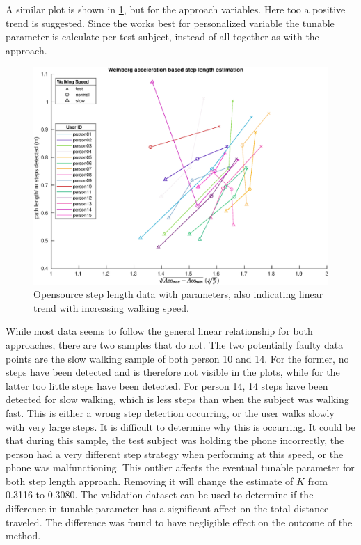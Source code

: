 A similar plot is shown in \cref{fig:step_length_weinberg}, but for the \citet{Weinberg2002} approach variables. Here too a positive trend is suggested. Since the \citet{Weinberg2002} works best for personalized variable the tunable parameter is calculate per test subject, instead of all together as with the \citet{Tian2016} approach. 

\begin{figure}[H]
	\centering
	\includegraphics[width=0.8\linewidth]{images/20201113_1639_weinberg}
	\caption{Opensource step length data with \citet{Weinberg2002} parameters, also indicating linear trend with increasing walking speed.}
	\label{fig:step_length_weinberg}
\end{figure}

While most data seems to follow the general linear relationship for both approaches, there are two samples that do not. The two potentially faulty data points are the slow walking sample of both person 10 and 14. For the former, no steps have been detected and is therefore not visible in the plots, while for the latter too little steps have been detected. For person 14, 14 steps have been detected for slow walking, which is less steps than when the subject was walking fast. This is either a wrong step detection occurring, or the user walks slowly with very large steps. It is difficult to determine why this is occurring. It could be that during this sample, the test subject was holding the phone incorrectly, the person had a very different step strategy when performing at this speed, or the phone was malfunctioning. This outlier affects the eventual tunable parameter for both step length approach. Removing it will change the estimate of $K$ from 0.3116 to 0.3080. The validation dataset can be used to determine if the difference in tunable parameter has a significant affect on the total distance traveled. The difference was found to have negligible effect on the outcome of the method.

